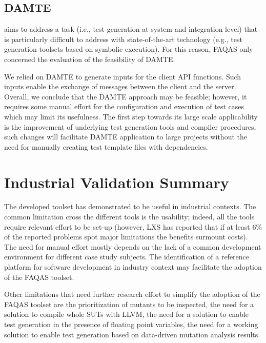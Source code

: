 \subsection{DAMTE}

\DAMTE aims to address a task (i.e., test generation at system and integration level) that is particularly difficult to address with state-of-the-art technology (e.g., test generation toolsets based on symbolic execution).
For this reason, FAQAS only concerned the evaluation of the feasibility of DAMTE.

We relied on DAMTE to generate inputs for the \PARAM client API functions. Such inputs enable the exchange of messages between the \PARAM client and the \PARAM server. Overall, we conclude that the DAMTE approach may be feasible; however, it requires some manual effort for the configuration and execution of test cases which may limit its usefulness. The first step towards its large scale applicability is the improvement of underlying test generation tools and compiler procedures, such changes will facilitate DAMTE application to large projects without the need for manually creating test template files with dependencies.


\STARTCHANGEDWPT

\section{Industrial Validation Summary}
\label{sec:validationsum}

The developed toolset has demonstrated to be useful in industrial contexts. The common limitation cross the different tools is the usability; indeed, all the tools require relevant effort to be set-up (however, LXS has reported that if at least 6\% of the reported problems spot major limitations the benefits surmount costs). The need for manual effort mostly depends on the lack of a common development environment for different case study subjects. The identification of a reference platform for software development in industry context may facilitate the adoption of the FAQAS toolset.

Other limitations that need further research effort to simplify the adoption of the FAQAS toolset are the prioritization of mutants to be inspected, the need for a solution to compile whole SUTs with LLVM, the need for a solution to enable test generation in the presence of floating point variables, the need for a working solution to enable test generation based on data-driven mutation analysis results.

